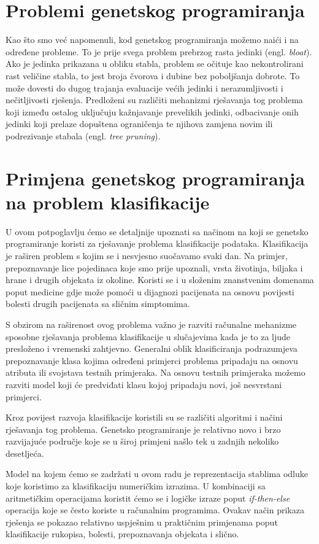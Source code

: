 \documentclass[times, utf8, zavrsni]{fer}
\begin{document}
\section{Problemi genetskog programiranja}
Kao što smo već napomenuli, kod genetskog programiranja možemo naići i na određene probleme. To je prije svega problem prebrzog rasta jedinki (engl. \textit {bloat}). Ako je jedinka prikazana u obliku stabla, problem se očituje kao nekontrolirani rast veličine stabla, to jest broja čvorova i dubine bez poboljšanja dobrote. To može dovesti do dugog trajanja evaluacije većih jedinki i nerazumljivosti i nečitljivosti rješenja. Predloženi su različiti mehanizmi rješavanja tog problema koji između ostalog uključuju kažnjavanje prevelikih jedinki, odbacivanje onih jedinki koji prelaze dopuštena ograničenja te njihova zamjena novim ili podrezivanje stabala (engl. \textit{tree pruning}). 
\section{Primjena genetskog programiranja na problem klasifikacije}
U ovom potpoglavlju ćemo se detaljnije upoznati sa načinom na koji se genetsko programiranje koristi za rješavanje problema klasifikacije podataka. Klasifikacija je raširen problem s kojim se i nesvjesno suočavamo svaki dan. Na primjer, prepoznavanje lice pojedinaca koje smo prije upoznali, vrsta životinja, biljaka i hrane i drugih objekata iz okoline. Koristi se i u složenim znanstvenim domenama poput medicine gdje može pomoći u dijagnozi pacijenata na osnovu povijesti bolesti drugih pacijenata sa sličnim simptomima. 

S obzirom na raširenost ovog problema važno je razviti računalne mehanizme sposobne rješavanja problema klasifikacije u slučajevima kada je to za ljude presloženo i vremenski zahtjevno. Generalni oblik klasificiranja podrazumjeva prepoznavanje klasa kojima određeni primjerci problema pripadaju na osnovu atributa ili svojstava testnih primjeraka. Na osnovu testnih primjeraka možemo razviti model koji će predviđati klasu kojoj pripadaju novi, još nesvrstani primjerci.

Kroz povijest razvoja klasifikacije koristili su se različiti algoritmi i načini rješavanja tog problema. Genetsko programiranje je relativno novo i brzo razvijajuće područje koje se u široj primjeni našlo tek u zadnjih nekoliko desetljeća.

Model na kojem ćemo se zadržati u ovom radu je reprezentacija stablima odluke koje koristimo za klasifikaciju numeričkim izrazima. U kombinaciji sa aritmetičkim operacijama koristit ćemo se i logičke izraze poput \textit{if-then-else} operacija koje se često koriste u računalnim programima. Ovakav način prikaza rješenja se pokazao relativno uspješnim u praktičnim primjenama poput klasifikacije rukopisa, bolesti, prepoznavanja objekata i slično. 
\end{document}

